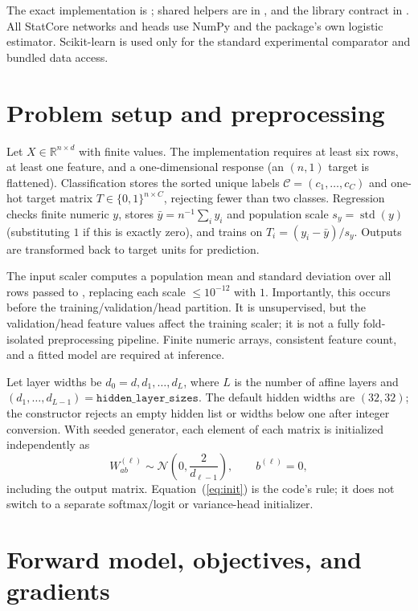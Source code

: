 \documentclass[conference]{IEEEtran}
\begin{document}
The exact implementation is ; shared helpers are in , and the library contract in . All StatCore networks and heads use NumPy and the package's own logistic estimator. Scikit-learn is used only for the standard experimental comparator and bundled data access.

\section{Problem setup and preprocessing}
Let $X\in\mathbb R^{n\times d}$ with finite values. The implementation requires at least six rows, at least one feature, and a one-dimensional response (an $(n,1)$ target is flattened). Classification stores the sorted unique labels $\mathcal C=(c_1,\ldots,c_C)$ and one-hot target matrix $T\in\{0,1\}^{n\times C}$, rejecting fewer than two classes. Regression checks finite numeric $y$, stores $\bar y=n^{-1}\sum_i y_i$ and population scale $s_y=\operatorname{std}(y)$ (substituting $1$ if this is exactly zero), and trains on $T_i=(y_i-\bar y)/s_y$. Outputs are transformed back to target units for prediction.

The input scaler computes a population mean and standard deviation over all rows passed to , replacing each scale $\leq10^{-12}$ with $1$. Importantly, this occurs before the training/validation/head partition. It is unsupervised, but the validation/head feature values affect the training scaler; it is not a fully fold-isolated preprocessing pipeline. Finite numeric arrays, consistent feature count, and a fitted model are required at inference.

Let layer widths be $d_0=d,d_1,\ldots,d_L$, where $L$ is the number of affine layers and $(d_1,\ldots,d_{L-1})=\texttt{hidden\_layer\_sizes}$. The default hidden widths are $(32,32)$; the constructor rejects an empty hidden list or widths below one after integer conversion. With seeded generator, each element of each matrix is initialized independently as
\begin{equation}
 W^{(\ell)}_{ab}\sim\mathcal N\!\left(0,\frac{2}{d_{\ell-1}}\right),\qquad b^{(\ell)}=0,
 \label{eq:init}
\end{equation}
including the output matrix. Equation~(\ref{eq:init}) is the code's rule; it does not switch to a separate softmax/logit or variance-head initializer.

\section{Forward model, objectives, and gradients}
\end{document}
